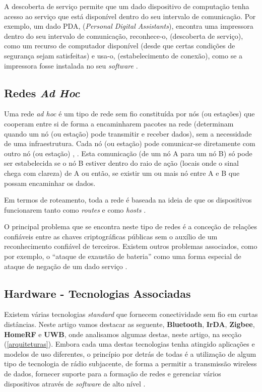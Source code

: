 \documentclass[conference]{IEEEtran}
\begin{document}
A descoberta de serviço permite que um dado dispositivo de computação tenha acesso ao serviço que está disponível dentro do seu intervalo de comunicação.
Por exemplo, um dado PDA, (\textit{Personal Digital Assistants}), encontra uma impressora dentro do seu intervalo de comunicação, reconhece-o, (descoberta de serviço), como um recurso de computador disponível (desde que certas condições de segurança sejam satisfeitas) e usa-o, (estabelecimento de conexão), como se a impressora fosse instalada no seu \textit{software} \cite{prasad2004ofdm}.

\subsection{Redes \textit{Ad Hoc}} \label{redes_ad_hoc}

Uma rede \textit{ad hoc} é um tipo de rede sem fio constituída por nós (ou estações) que cooperam entre si de forma a encaminharem pacotes na rede (determinam quando um nó (ou estação) pode transmitir e receber dados), sem a necessidade de uma infraestrutura. Cada nó (ou estação) pode comunicar-se diretamente com outro nó (ou estação) \cite{salonidis2005distributed}, \cite{rubinstein2002qualidade}. 
Esta comunicação (de um nó A para um nó B) só pode ser estabelecida se o nó B estiver dentro do raio de ação (locais onde o sinal chega com clareza) de A ou então, se existir um ou mais nó entre A e B que possam encaminhar os dados.

Em termos de roteamento, toda a rede é baseada na ideia de que os dispositivos funcionarem tanto como \textit{routes} e como \textit{hosts} \cite{prasad2004ofdm}.

O principal problema que se encontra neste tipo de redes é a conceção de relações confiáveis entre as chaves criptográficas públicas sem o auxílio de um reconhecimento confiável de terceiros. 
Existem outros problemas associados, como por exemplo, o “ataque de exaustão de bateria” como uma forma especial de ataque de negação de um dado serviço \cite{prasad2004ofdm}.


\subsection{Hardware - Tecnologias Associadas}

Existem várias tecnologias \textit{standard} que fornecem conectividade sem fio em curtas distâncias. Neste artigo vamos destacar as seguente, \textbf{Bluetooth}, \textbf{IrDA}, \textbf{Zigbee}, \textbf{HomeRF} e \textbf{UWB}, onde analisamos algumas destas, neste artigo, na secção (\ref{arquiteturas}).
Embora cada uma destas tecnologias tenha atingido aplicações e modelos de uso diferentes, o princípio por detrás de todas é a utilização de algum tipo de tecnologia de rádio subjacente, de forma a permitir a transmissão wireless de dados, fornecer suporte para a formação de redes e gerenciar vários dispositivos através de \textit{software} de alto nível \cite{prasad2004ofdm}.
\end{document}
